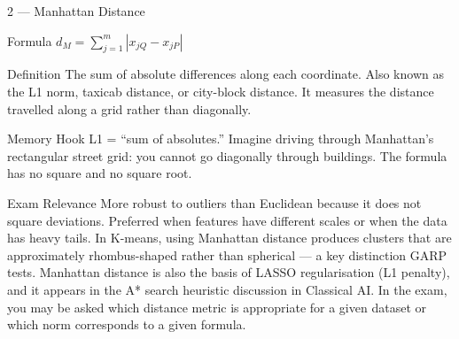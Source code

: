 \documentclass[aspectratio=169,8pt]{beamer}
\begin{document}
	\begin{frame}{2 --- Manhattan Distance}
		\begin{block}{Formula}
			$d_M = \sum_{j=1}^{m}|x_{jQ} - x_{jP}|$
		\end{block}
		\begin{block}{Definition}
			The sum of absolute differences along each coordinate. Also known as the L1 norm, taxicab distance, or city-block distance. It measures the distance travelled along a grid rather than diagonally.
		\end{block}
		\begin{block}{Memory Hook}
			L1 = ``sum of absolutes.'' Imagine driving through Manhattan's rectangular street grid: you cannot go diagonally through buildings. The formula has no square and no square root.
		\end{block}
		\begin{block}{Exam Relevance}
			More robust to outliers than Euclidean because it does not square deviations. Preferred when features have different scales or when the data has heavy tails. In K-means, using Manhattan distance produces clusters that are approximately rhombus-shaped rather than spherical --- a key distinction GARP tests. Manhattan distance is also the basis of LASSO regularisation (L1 penalty), and it appears in the A* search heuristic discussion in Classical AI. In the exam, you may be asked which distance metric is appropriate for a given dataset or which norm corresponds to a given formula.
		\end{block}
	\end{frame}
	
\end{document}
